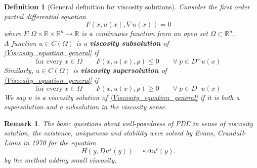 \documentclass[12pt, oneside]{amsart}  	%
\newtheorem{definition}{Definition}
\newtheorem{remark}{Remark}
\begin{document}
\begin{definition}[General definition for viscosity solutions] Consider the first order partial differential equation
\begin{equation}\label{Viscosity_equation_general}
F(x,u(x),\nabla u(x)) = 0
\end{equation}
where $F:\Omega \times \mathbb{R}\times \mathbb{R}^n\longrightarrow \mathbb{R}$ is a continuous function from an open set $\Omega\subset \mathbb{R}^n$.\\
A function $u\in C(\Omega)$ is a \textbf{viscosity subsolution} of \eqref{Viscosity_equation_general} if
\begin{equation*}
\text{for every}\;x\in \Omega\qquad F(x,u(x),p) \leq 0 \qquad\forall\; p\in D^+u(x)
\end{equation*}
Similarly, $u\in C(\Omega)$ is \textbf{viscosity supersolution} of \eqref{Viscosity_equation_general} if
\begin{equation*}
\text{for every}\;x\in \Omega\qquad F(x,u(x),p) \geq 0 \qquad\forall\; p\in D^-u(x)
\end{equation*}
We say $u$ is a viscosity solution of \eqref{Viscosity_equation_general} if it is both a supersolution and a subsolution in the viscosity sense.
\end{definition}

\begin{remark}
The basic questions about well-posedness of PDE in sense of viscosity solution, the existence, uniqueness and stability were solved by Evans, Crandall-Lions in 1970 for the equation
\begin{equation*}
H(y,Du^\varepsilon(y)) = \varepsilon \Delta u^\varepsilon(y).
\end{equation*}
by the method adding small viscosity.
\end{remark}
\end{document}
